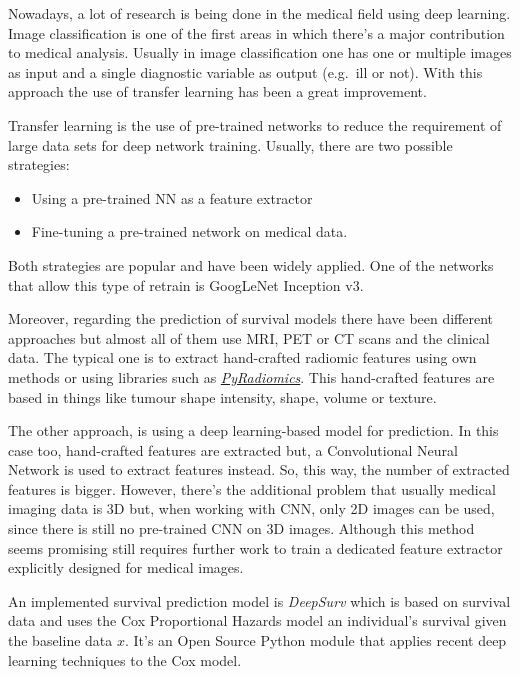Nowadays, a lot of research is being done in the medical field using deep learning. Image
classification is one of the first areas in which there's a major contribution to medical analysis.
Usually in image classification one has one or multiple images as input and a single diagnostic 
variable as output (e.g.~ill or not). With this approach the use of transfer learning has been a
great improvement.
~\cite{survey-deep-learning}

Transfer learning is the use of pre-trained networks to reduce the requirement of large data
sets for deep network training. Usually, there are two possible strategies: 
\begin{itemize}[noitemsep, topsep=0pt]
  \item Using a pre-trained NN as a feature extractor
  \item Fine-tuning a pre-trained network on medical data.
\end{itemize}

Both strategies are popular and have been widely applied. One of the networks that allow this type
of retrain is GoogLeNet Inception v3.
~\cites{GoogLeNet}{NNRetrain}{inceptionRetrain}

Moreover, regarding the prediction of survival models there have been different approaches but
almost all of them use MRI, PET or CT scans and the clinical data. The typical one is to extract
hand-crafted radiomic features using own methods or using libraries such as
\href{https://github.com/Radiomics/pyradiomics}{\emph{PyRadiomics}}. This hand-crafted features are
based in things like tumour shape intensity, shape, volume or texture.
~\cites{PyRadiomics}{tumour-radiomics}

The other approach, is using a deep learning-based model for prediction. In this case too, 
hand-crafted features are extracted but, a Convolutional Neural Network is used to extract
features instead. So, this way, the number of extracted features is bigger. However,
there's the additional problem that usually medical imaging data is 3D but, when working 
with CNN, only 2D images can be used, since there is still no pre-trained CNN on 3D images.
Although this method seems promising still requires further work to train a dedicated 
feature extractor explicitly designed for medical images.
~\cite{deep-learning-radiomics-gbm}

An implemented survival prediction model is \emph{DeepSurv} which is based on survival data
and uses the Cox Proportional Hazards model an individual's survival given the baseline data
\( x \). It's an Open Source Python module that applies recent deep learning techniques 
to the Cox model.
~\cites{DeepSurv}{Cox}

